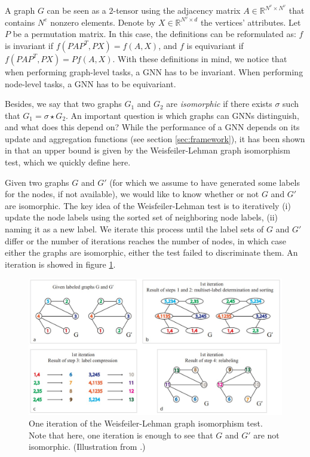 \documentclass{article}
\begin{document}
A graph $G$ can be seen as a $2$-tensor using the adjacency matrix $A \in \mathbb{R}^{N^v \times N^v}$ that contains $N^e$ nonzero elements. Denote by $X \in \mathbb{R}^{N^v \times d}$ the vertices' attributes. Let $P$ be a permutation matrix. In this case, the definitions can be reformulated as: $f$ is invariant if $f \left( PAP^T, PX \right) = f \left( A, X \right)$, and $f$ is equivariant if $f \left( PAP^T, PX \right) = P f \left( A, X \right)$. With these definitions in mind, we notice that when performing graph-level tasks, a GNN has to be invariant. When performing node-level tasks, a GNN has to be equivariant.

Besides, we say that two graphs $G_1$ and $G_2$ are \emph{isomorphic} if there exists $\sigma$ such that $G_1 = \sigma \star G_2$. An important question is which graphs can GNNs distinguish, and what does this depend on? While the performance of a GNN depends on its update and aggregation functions (see section \ref{sec:framework}), it has been shown in \cite[Xu et al. 2019]{xu2019powerful} that an upper bound is given by the Weisfeiler-Lehman graph isomorphism test, which we quickly define here.

Given two graphs $G$ and $G'$ (for which we assume to have generated some labels for the nodes, if not available), we would like to know whether or not $G$ and $G'$ are isomorphic. The key idea of the Weisfeiler-Lehman test is to iteratively (i) update the node labels using the sorted set of neighboring node labels, (ii) naming it as a new label. We iterate this process until the label sets of $G$ and $G'$ differ or the number of iterations reaches the number of nodes, in which case either the graphs are isomorphic, either the test failed to discriminate them. An iteration is showed in figure \ref{fig:weisfeiler-lehman}.

\begin{figure}
    \centering
    \includegraphics[scale=.58]{images/weisfeiler_lehman_iteration.jpg}
    \caption{One iteration of the Weisfeiler-Lehman graph isomorphism test. Note that here, one iteration is enough to see that $G$ and $G'$ are not isomorphic. (Illustration from \cite{shervashidze2011WeisfeilerLehmanGK}.)}
    \label{fig:weisfeiler-lehman}
\end{figure}
\end{document}
